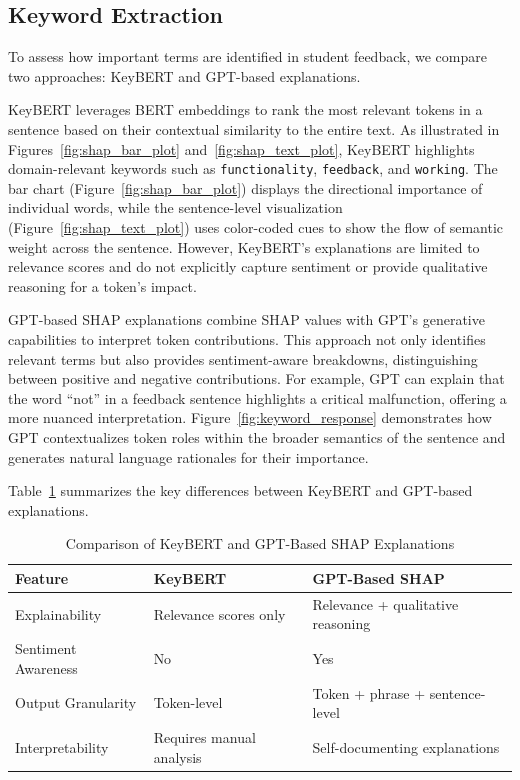 \documentclass[manuscript,review, anonymous]{acmart}
\begin{document}
\subsection{Keyword Extraction}

To assess how important terms are identified in student feedback, we compare two approaches: KeyBERT and GPT-based explanations.

KeyBERT leverages BERT embeddings to rank the most relevant tokens in a sentence based on their contextual similarity to the entire text. As illustrated in Figures~\ref{fig:shap_bar_plot} and~\ref{fig:shap_text_plot}, KeyBERT highlights domain-relevant keywords such as \texttt{functionality}, \texttt{feedback}, and \texttt{working}. The bar chart (Figure~\ref{fig:shap_bar_plot}) displays the directional importance of individual words, while the sentence-level visualization (Figure~\ref{fig:shap_text_plot}) uses color-coded cues to show the flow of semantic weight across the sentence. However, KeyBERT’s explanations are limited to relevance scores and do not explicitly capture sentiment or provide qualitative reasoning for a token’s impact.

GPT-based SHAP explanations combine SHAP values with GPT’s generative capabilities to interpret token contributions. This approach not only identifies relevant terms but also provides sentiment-aware breakdowns, distinguishing between positive and negative contributions. For example, GPT can explain that the word ``not'' in a feedback sentence highlights a critical malfunction, offering a more nuanced interpretation. Figure~\ref{fig:keyword_response} demonstrates how GPT contextualizes token roles within the broader semantics of the sentence and generates natural language rationales for their importance.

Table~\ref{tab:keyword_comparison} summarizes the key differences between KeyBERT and GPT-based explanations.

\begin{table}[h]
\centering
\caption{Comparison of KeyBERT and GPT-Based SHAP Explanations}
\label{tab:keyword_comparison}
\renewcommand{\arraystretch}{1.4} %
\begin{tabular}{|p{2cm}|p{2.5cm}|p{2.5cm}|}
\hline
\textbf{Feature} & \textbf{KeyBERT} & \textbf{GPT-Based SHAP} \\
\hline
Explainability & Relevance scores only & Relevance + qualitative reasoning \\
\hline
Sentiment Awareness & No & Yes \\
\hline
Output Granularity & Token-level & Token + phrase + sentence-level \\
\hline
Interpretability & Requires manual analysis & Self-documenting explanations \\
\hline
\end{tabular}
\end{table}
\end{document}
